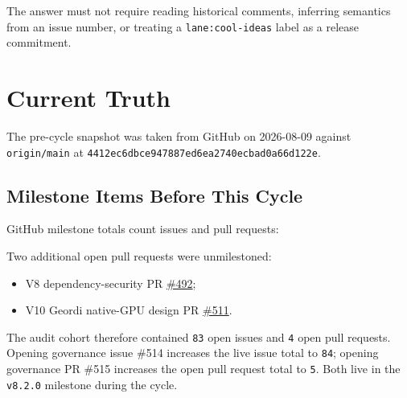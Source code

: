 The answer must not require reading historical comments, inferring semantics from an issue number, or treating a \texttt{l\allowbreak{}a\allowbreak{}n\allowbreak{}e\allowbreak{}:\allowbreak{}c\allowbreak{}o\allowbreak{}o\allowbreak{}l\allowbreak{}-\allowbreak{}i\allowbreak{}d\allowbreak{}e\allowbreak{}a\allowbreak{}s} label as a release commitment.

\section{Current Truth}\label{record-249-current-truth}

The pre-cycle snapshot was taken from GitHub on 2026-08-09 against \texttt{o\allowbreak{}r\allowbreak{}i\allowbreak{}g\allowbreak{}i\allowbreak{}n\allowbreak{}/\allowbreak{}m\allowbreak{}a\allowbreak{}i\allowbreak{}n} at \texttt{4\allowbreak{}4\allowbreak{}1\allowbreak{}2\allowbreak{}e\allowbreak{}c\allowbreak{}6\allowbreak{}d\allowbreak{}b\allowbreak{}c\allowbreak{}e\allowbreak{}9\allowbreak{}4\allowbreak{}7\allowbreak{}8\allowbreak{}8\allowbreak{}7\allowbreak{}e\allowbreak{}d\allowbreak{}6\allowbreak{}e\allowbreak{}a\allowbreak{}2\allowbreak{}7\allowbreak{}4\allowbreak{}0\allowbreak{}e\allowbreak{}c\allowbreak{}b\allowbreak{}a\allowbreak{}d\allowbreak{}0\allowbreak{}a\allowbreak{}6\allowbreak{}6\allowbreak{}d\allowbreak{}1\allowbreak{}2\allowbreak{}2\allowbreak{}e}.

\subsection{Milestone Items Before This Cycle}\label{record-249-milestone-items-before-this-cycle}

GitHub milestone totals count issues and pull requests:



Two additional open pull requests were unmilestoned:

\begin{itemize}
\tightlist
\item
  V8 dependency-security PR \href{https://github.com/flyingrobots/bijou/pull/492}{\#492};
\item
  V10 Geordi native-GPU design PR \href{https://github.com/flyingrobots/bijou/pull/511}{\#511}.
\end{itemize}

The audit cohort therefore contained \texttt{8\allowbreak{}3} open issues and \texttt{4} open pull requests. Opening governance issue \#514 increases the live issue total to \texttt{8\allowbreak{}4}; opening governance PR \#515 increases the open pull request total to \texttt{5}. Both live in the \texttt{v\allowbreak{}8\allowbreak{}.\allowbreak{}2\allowbreak{}.\allowbreak{}0} milestone during the cycle.

